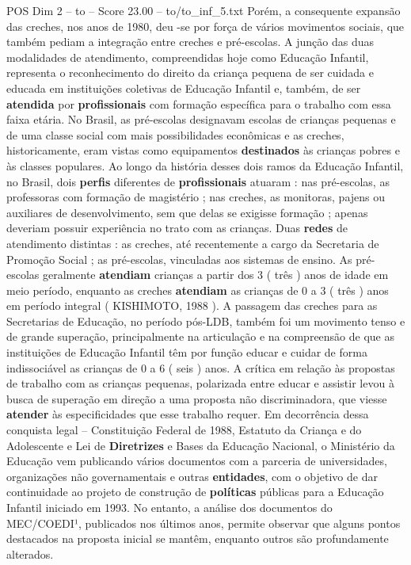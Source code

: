 \begin{textsample}{POS Dim 2 – to – Score 23.00 – to/to\_inf\_5.txt}
Porém, a consequente expansão das creches, nos anos de 1980, deu -se por força de vários movimentos sociais, que também pediam a integração entre creches e pré-escolas.
A junção das duas modalidades de atendimento, compreendidas hoje como Educação Infantil, representa o reconhecimento do direito da criança pequena de ser cuidada e educada em instituições coletivas de Educação Infantil e, também, de ser \textbf{atendida} por \textbf{profissionais} com formação específica para o trabalho com essa faixa etária.
No Brasil, as pré-escolas designavam escolas de crianças pequenas e de uma classe social com mais possibilidades econômicas e as creches, historicamente, eram vistas como equipamentos \textbf{destinados} às crianças pobres e às classes populares.
Ao longo da história desses dois ramos da Educação Infantil, no Brasil, dois \textbf{perfis} diferentes de \textbf{profissionais} atuaram : nas pré-escolas, as professoras com formação de magistério ; nas creches, as monitoras, pajens ou auxiliares de desenvolvimento, sem que delas se exigisse formação ; apenas deveriam possuir experiência no trato com as crianças.
Duas \textbf{redes} de atendimento distintas : as creches, até recentemente a cargo da Secretaria de Promoção Social ; as pré-escolas, vinculadas aos sistemas de ensino.
As pré-escolas geralmente \textbf{atendiam} crianças a partir dos 3 ( três ) anos de idade em meio período, enquanto as creches \textbf{atendiam} as crianças de 0 a 3 ( três ) anos em período integral ( KISHIMOTO, 1988 ).
A passagem das creches para as Secretarias de Educação, no período pós-LDB, também foi um movimento tenso e de grande superação, principalmente na articulação e na compreensão de que as instituições de Educação Infantil têm por função educar e cuidar de forma indissociável as crianças de 0 a 6 ( seis ) anos.
A crítica em relação às propostas de trabalho com as crianças pequenas, polarizada entre educar e assistir levou à busca de superação em direção a uma proposta não discriminadora, que viesse \textbf{atender} às especificidades que esse trabalho requer.
Em decorrência dessa conquista legal – Constituição Federal de 1988, Estatuto da Criança e do Adolescente e Lei de \textbf{Diretrizes} e Bases da Educação Nacional, o Ministério da Educação vem publicando vários documentos com a parceria de universidades, organizações não governamentais e outras \textbf{entidades}, com o objetivo de dar continuidade ao projeto de construção de \textbf{políticas} públicas para a Educação Infantil iniciado em 1993.
No entanto, a análise dos documentos do MEC/COEDI¹, publicados nos últimos anos, permite observar que alguns pontos destacados na proposta inicial se mantêm, enquanto outros são profundamente alterados.

\end{textsample}
